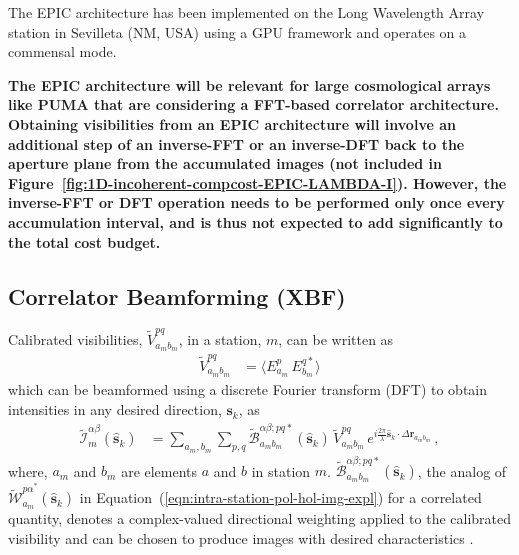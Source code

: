 \documentclass[
  journal=pasa,
  manuscript=article-type,
  year=2020,
  volume=37,
]{cup-journal}
\begin{document}
The EPIC architecture has been implemented on the Long Wavelength Array station in Sevilleta (NM, USA) \cite{Kent+2019,Kent+2020,Krishnan+2023} using a GPU framework and operates on a commensal mode.

\textbf{The EPIC architecture will be relevant for large cosmological arrays like PUMA that are considering a FFT-based correlator architecture. Obtaining visibilities from an EPIC architecture will involve an additional step of an inverse-FFT or an inverse-DFT back to the aperture plane from the accumulated images (not included in Figure~\ref{fig:1D-incoherent-compcost-EPIC-LAMBDA-I}). However, the inverse-FFT or DFT operation needs to be performed only once every accumulation interval, and is thus not expected to add significantly to the total cost budget.} 

\subsection{Correlator Beamforming (XBF)}

Calibrated visibilities, $\widetilde{V}_{a_m b_m}^{pq}$, in a station, $m$, can be written as 
\begin{align}
    \widetilde{V}_{a_m b_m}^{pq} &= \bigl\langle E_{a_m}^p \, E_{b_m}^{q*}\bigr\rangle \label{eqn:intra-station-pol-visibilities}
\end{align}
which can be beamformed using a discrete Fourier transform (DFT) to obtain intensities in any desired direction, $\boldsymbol{s}_k$, as
\begin{align}
    \widetilde{\mathcal{I}}_m^{\alpha\beta}(\hat{\boldsymbol{s}}_k) 
    &= \sum_{a_m,b_m} \sum_{p,q} \widetilde{\mathcal{B}}_{a_m b_m}^{\alpha\beta;pq*}(\hat{\boldsymbol{s}}_k) \, \widetilde{V}_{a_m b_m}^{pq} \,  e^{i\frac{2\pi}{\lambda} \hat{\boldsymbol{s}}_k\cdot\Delta\boldsymbol{r}_{a_m b_m}} \, , \label{eqn:intra-station-pol-xbf-img-expl} 
\end{align}
where, $a_m$ and $b_m$ are elements $a$ and $b$ in station $m$. $\widetilde{\mathcal{B}}_{a_m b_m}^{\alpha\beta;pq*}(\hat{\boldsymbol{s}}_k)$, the analog of $\widetilde{\mathcal{W}}_{a_m}^{{p\alpha}^*}(\hat{\boldsymbol{s}}_k)$ in Equation~(\ref{eqn:intra-station-pol-hol-img-expl}) for a correlated quantity, denotes a complex-valued directional weighting applied to the calibrated visibility and can be chosen to produce images with desired characteristics \citep{Masui+2019}. 
\end{document}
